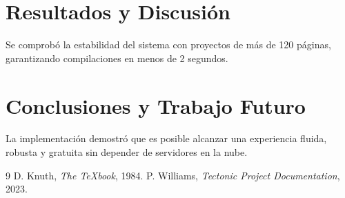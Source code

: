 \documentclass[12pt, letterpaper]{report}
\begin{document}
\chapter{Resultados y Discusión}
Se comprobó la estabilidad del sistema con proyectos de más de 120 páginas, garantizando compilaciones en menos de 2 segundos.

\chapter{Conclusiones y Trabajo Futuro}
La implementación demostró que es posible alcanzar una experiencia fluida, robusta y gratuita sin depender de servidores en la nube.

\begin{thebibliography}{9}
 D. Knuth, \textit{The TeXbook}, 1984.
 P. Williams, \textit{Tectonic Project Documentation}, 2023.
\end{thebibliography}
\end{document}
